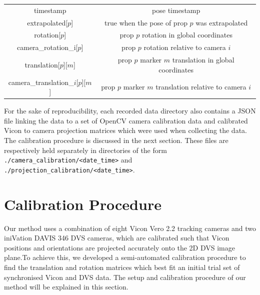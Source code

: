 \documentclass{article}
\begin{document}
\begin{center}
	\begin{tabular}{|c|c|}
		timestamp                           & pose timestamp \\
		extrapolated[$p$]                   & true when the pose of prop $p$ was extrapolated \\
		rotation[$p$]                       & prop $p$ rotation in global coordinates \\
		camera\_rotation\_i[$p$]            & prop $p$ rotation relative to camera $i$ \\
		translation[$p$][$m$]               & prop $p$ marker $m$ translation in global coordinates \\
		camera\_translation\_$i$[$p$][$m$]  & prop $p$ marker $m$ translation relative to camera $i$ \\
	\end{tabular}
\end{center}

For the sake of reproducibility, each recorded data directory also contains a JSON file linking the data to a set of OpenCV camera calibration data and calibrated Vicon to camera projection matrices which were used when collecting the data. The calibration procedure is discussed in the next section. These files are respectively held separately in directories of the form \lstinline|./camera_calibration/<date_time>| and \lstinline|./projection_calibration/<date_time>|.


\section{Calibration Procedure}
Our method uses a combination of eight Vicon Vero 2.2 tracking cameras and two iniVation DAVIS 346 DVS cameras, which are calibrated such that Vicon positions and orientations are projected accurately onto the 2D DVS image plane.To achieve this, we developed a semi-automated calibration procedure to find the translation and rotation matrices which best fit an initial trial set of synchronised Vicon and DVS data. The setup and calibration procedure of our method will be explained in this section.
\end{document}
